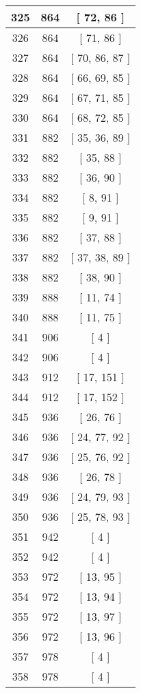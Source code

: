 \begin{center}
\begin{longtable}[H]{|| c c c ||}
\hline
325 & 864 & [ 72, 86 ] \\ 
\hline
326 & 864 & [ 71, 86 ] \\ 
\hline
327 & 864 & [ 70, 86, 87 ] \\ 
\hline
328 & 864 & [ 66, 69, 85 ] \\ 
\hline
329 & 864 & [ 67, 71, 85 ] \\ 
\hline
330 & 864 & [ 68, 72, 85 ] \\ 
\hline
331 & 882 & [ 35, 36, 89 ] \\ 
\hline
332 & 882 & [ 35, 88 ] \\ 
\hline
333 & 882 & [ 36, 90 ] \\ 
\hline
334 & 882 & [ 8, 91 ] \\ 
\hline
335 & 882 & [ 9, 91 ] \\ 
\hline
336 & 882 & [ 37, 88 ] \\ 
\hline
337 & 882 & [ 37, 38, 89 ] \\ 
\hline
338 & 882 & [ 38, 90 ] \\ 
\hline
339 & 888 & [ 11, 74 ] \\ 
\hline
340 & 888 & [ 11, 75 ] \\ 
\hline
341 & 906 & [ 4 ] \\ 
\hline
342 & 906 & [ 4 ] \\ 
\hline
343 & 912 & [ 17, 151 ] \\ 
\hline
344 & 912 & [ 17, 152 ] \\ 
\hline
345 & 936 & [ 26, 76 ] \\ 
\hline
346 & 936 & [ 24, 77, 92 ] \\ 
\hline
347 & 936 & [ 25, 76, 92 ] \\ 
\hline
348 & 936 & [ 26, 78 ] \\ 
\hline
349 & 936 & [ 24, 79, 93 ] \\ 
\hline
350 & 936 & [ 25, 78, 93 ] \\ 
\hline
351 & 942 & [ 4 ] \\ 
\hline
352 & 942 & [ 4 ] \\ 
\hline
353 & 972 & [ 13, 95 ] \\ 
\hline
354 & 972 & [ 13, 94 ] \\ 
\hline
355 & 972 & [ 13, 97 ] \\ 
\hline
356 & 972 & [ 13, 96 ] \\ 
\hline
357 & 978 & [ 4 ] \\ 
\hline
358 & 978 & [ 4 ] \\ 
\hline
\end{longtable}
\end{center}
